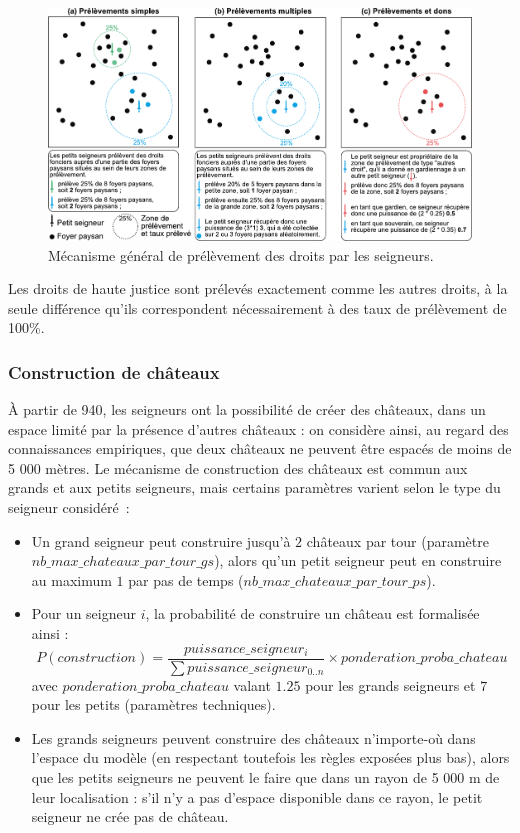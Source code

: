 \begin{figure}[H]
	\centering
	\includegraphics[width=\linewidth]{img/prelevements_droits.pdf}
	\caption{Mécanisme général de prélèvement des droits par les seigneurs.}
	\label{fig:prelevement-droits}
\end{figure}

Les droits de haute justice sont prélevés exactement comme les autres droits, à la seule différence qu'ils correspondent nécessairement à des taux de prélèvement de 100\%.

\subsubsection{Construction de châteaux \label{sssec:constru-chateaux}}


À partir de 940, les seigneurs ont la possibilité de créer des châteaux, dans un espace limité par la présence d'autres châteaux : on considère ainsi, au regard des connaissances empiriques, que deux châteaux ne peuvent être espacés de moins de 5 000 mètres.
Le mécanisme de construction des châteaux est commun aux grands et aux petits seigneurs, mais certains paramètres varient selon le type du seigneur considéré :
\begin{itemize}
	\item Un grand seigneur peut construire jusqu'à $2$ châteaux par tour (paramètre $nb\_max\_chateaux\_par\_tour\_gs$), alors qu'un petit seigneur peut en construire au maximum $1$ par pas de temps ($nb\_max\_chateaux\_par\_tour\_ps$).
	\item Pour un seigneur $i$, la probabilité de construire un château est formalisée ainsi :\\
	$$ P \left( construction \right) = \frac{puissance\_seigneur_{i}}{\sum{puissance\_seigneur_{0..n}}} \times ponderation\_proba\_chateau $$ avec $ponderation\_proba\_chateau$ valant $1.25$ pour les grands seigneurs et $7$ pour les petits (paramètres techniques).
	\item Les grands seigneurs peuvent construire des châteaux n'importe-où dans l'espace du modèle (en respectant toutefois les règles exposées plus bas), alors que les petits seigneurs ne peuvent le faire que dans un rayon de 5 000 m de leur localisation : s'il n'y a pas d'espace disponible dans ce rayon, le petit seigneur ne crée pas de château.
\end{itemize}

